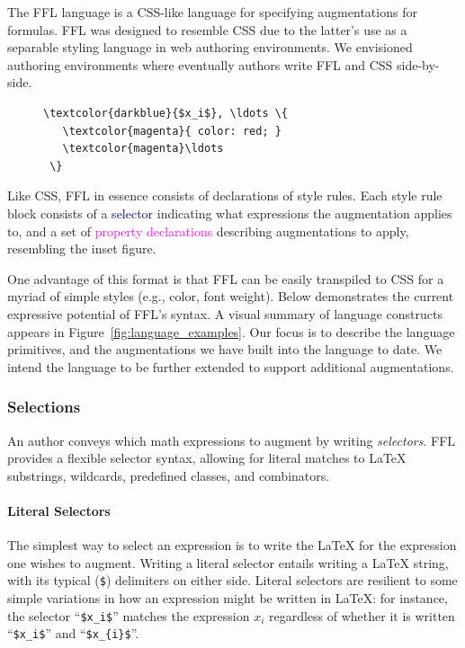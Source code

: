 The FFL language is a CSS-like language for specifying augmentations for formulas. FFL was designed to resemble CSS due to the latter's use as a separable styling language in web authoring environments. We envisioned authoring environments where eventually authors write FFL and CSS side-by-side.

\begin{figure}
\vspace{-2ex} %
\begin{Verbatim}[commandchars=\\\{\}]
 \textcolor{darkblue}{$x_i$}, \ldots \{
   \textcolor{magenta}{ color: red; }
   \textcolor{magenta}\ldots
 \}
\end{Verbatim}
\end{figure}
Like CSS, FFL in essence consists of declarations of style rules. Each style rule block consists of a \textcolor{darkblue}{selector} indicating what expressions the augmentation applies to, and a set of \textcolor{magenta}{property declarations} describing augmentations to apply, resembling the inset figure.

One advantage of this format is that FFL can be easily transpiled to CSS for a myriad of simple styles (e.g., color, font weight). Below demonstrates the current expressive potential of FFL's syntax. A visual summary of language constructs appears in Figure~\ref{fig:language_examples}. Our focus is to describe the language primitives, and the augmentations we have built into the language to date. We intend the language to be further extended to support additional augmentations.

\subsubsection{Selections}
An author conveys which math expressions to augment by writing \emph{selectors}. FFL provides a flexible selector syntax, allowing for literal matches to LaTeX substrings, wildcards, predefined classes, and combinators.

\paragraph{Literal Selectors} The simplest way to select an expression is to write the LaTeX for the expression one wishes to augment. Writing a literal selector entails writing a LaTeX string, with its typical (\texttt\$) delimiters on either side. Literal selectors are resilient to some simple variations in how an expression might be written in LaTeX: for instance, the selector ``\texttt{\$x\_i\$}'' matches the expression $x_i$ regardless of whether it is written ``\texttt{\$x\_i\$}'' and ``\texttt{\$x\_\{i\}\$}''.

